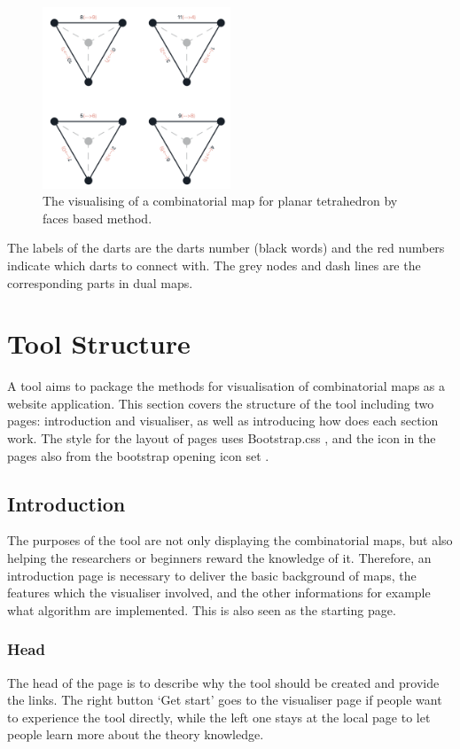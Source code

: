   \begin{figure}[htb]
    \centering
    \includegraphics[width=0.5\textwidth]{../../image/facesmap.png}
    \caption{The visualising of a combinatorial map for planar tetrahedron by faces based method.}
    \label{fig:figures:facesmap}
  \end{figure}

  The labels of the darts are the darts number (black words) and the red numbers indicate which darts to connect with. The grey nodes and dash lines are the corresponding parts in dual maps.

  \section{Tool Structure}

  A tool aims to package the methods for visualisation of combinatorial maps as a website application. This section covers the structure of the tool including two pages: introduction and visualiser, as well as introducing how does each section work. The style for the layout of pages uses Bootstrap.css \cite{bootstrap2019}, and the icon in the pages also from the bootstrap opening icon set \cite{openicon2019}.

  \subsection{Introduction}
  The purposes of the tool are not only displaying the combinatorial maps, but also helping the researchers or beginners reward the knowledge of it. Therefore, an introduction page is necessary to deliver the basic background of maps, the features which the visualiser involved, and the other informations for example what algorithm are implemented. This is also seen as the starting page.

  \subsubsection{Head}
  The head of the page is to describe why the tool should be created and provide the links. The right button ‘Get start’ goes to the visualiser page if people want to experience the tool directly, while the left one stays at the local page to let people learn more about the theory knowledge.
  
